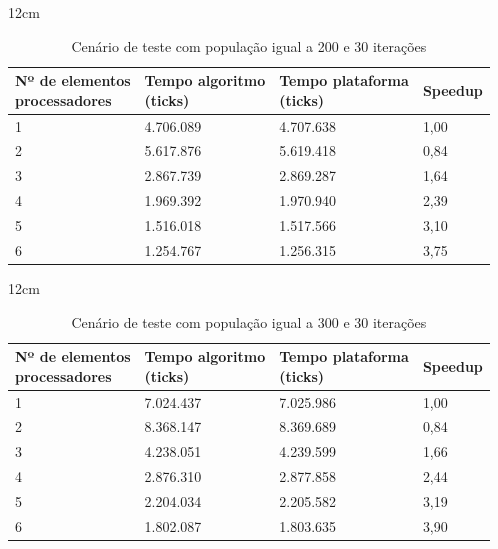 \begin{table}[h]{12cm}
    \caption{Cenário de teste com população igual a 200 e 30 iterações}
    \label{tbl:taylor-vortex-parameters}
    \begin{tabular}{llll}
        \hline
        \shortstack[l]{Nº de elementos \\ processadores} & \shortstack[l]{Tempo algoritmo \\ (ticks)} & \shortstack[l]{Tempo plataforma \\ (ticks)} & Speedup \\
        \hline
        1 & 4.706.089 & 4.707.638 & 1,00 \\
        2 & 5.617.876 & 5.619.418 & 0,84 \\
        3 & 2.867.739 & 2.869.287 &	1,64 \\
        4 & 1.969.392 & 1.970.940 & 2,39 \\
        5 & 1.516.018 & 1.517.566 & 3,10 \\
        6 & 1.254.767 & 1.256.315 & 3,75 \\
        \hline
    \end{tabular}
\end{table}

\begin{table}[h]{12cm}
    \caption{Cenário de teste com população igual a 300 e 30 iterações}
    \label{tbl:taylor-vortex-parameters}
    \begin{tabular}{llll}
        \hline
        \shortstack[l]{Nº de elementos \\ processadores} & \shortstack[l]{Tempo algoritmo \\ (ticks)} & \shortstack[l]{Tempo plataforma \\ (ticks)} & Speedup \\
        \hline
        1 & 7.024.437 & 7.025.986 & 1,00 \\
        2 & 8.368.147 & 8.369.689 & 0,84 \\
        3 & 4.238.051 & 4.239.599 &	1,66 \\
        4 & 2.876.310 & 2.877.858 & 2,44 \\
        5 & 2.204.034 & 2.205.582 & 3,19 \\
        6 & 1.802.087 & 1.803.635 & 3,90 \\
        \hline
    \end{tabular}
\end{table}

